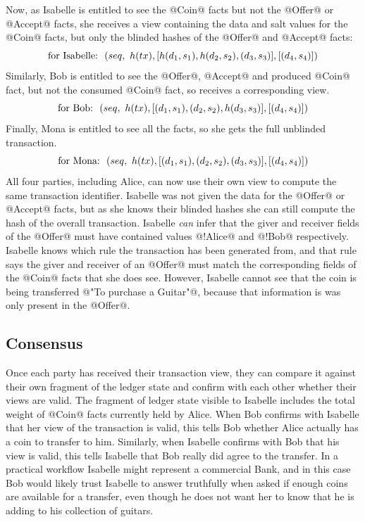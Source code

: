 Now, as Isabelle is entitled to see the @Coin@ facts but not the @Offer@ or @Accept@ facts, she receives a view containing the data and salt values for the @Coin@ facts, but only the blinded hashes of the @Offer@ and @Accept@ facts:
$$
\textrm{for Isabelle:}~~(seq,~ h(tx), [h(d_1, s_1), h(d_2, s_2), (d_3, s_3)], [(d_4, s_4)])
$$
Similarly, Bob is entitled to see the @Offer@, @Accept@ and produced @Coin@ fact, but not the consumed @Coin@ fact, so receives a corresponding view.
$$
\textrm{for Bob:}~~(seq,~ h(tx), [(d_1, s_1), (d_2, s_2), h(d_3, s_3)], [(d_4, s_4)])
$$
Finally, Mona is entitled to see all the facts, so she gets the full unblinded transaction.
$$
\textrm{for Mona:}~~(seq,~ h(tx), [(d_1, s_1), (d_2, s_2), (d_3, s_3)], [(d_4, s_4)])
$$
All four parties, including Alice, can now use their own view to compute the same transaction identifier. Isabelle was not given the data for the @Offer@ or @Accept@ facts, but as she knows their blinded hashes she can still compute the hash of the overall transaction. Isabelle \emph{can} infer that the giver and receiver fields of the @Offer@ must have contained values @!Alice@ and @!Bob@ respectively. Isabelle knows which rule the transaction has been generated from, and that rule says the giver and receiver of an @Offer@ must match the corresponding fields of the @Coin@ facts that she does see. However, Isabelle cannot see that the coin is being transferred @"To purchase a Guitar"@, because that information is was only present in the @Offer@.


\subsection{Consensus}
Once each party has received their transaction view, they can compare it against their own fragment of the ledger state and confirm with each other whether their views are valid. The fragment of ledger state visible to Isabelle includes the total weight of @Coin@ facts currently held by Alice. When Bob confirms with Isabelle that her view of the transaction is valid, this tells Bob whether Alice actually has a coin to transfer to him. Similarly, when Isabelle confirms with Bob that his view is valid, this tells Isabelle that Bob really did agree to the transfer. In a practical workflow Isabelle might represent a commercial Bank, and in this case Bob would likely trust Isabelle to answer truthfully when asked if enough coins are available for a transfer, even though he does not want her to know that he is adding to his collection of guitars.

